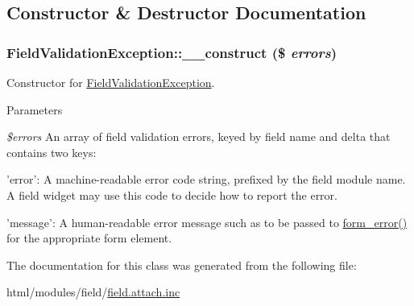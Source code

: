 \subsection{Constructor \& Destructor Documentation}
\hypertarget{classFieldValidationException_a9d96242a9e8d70ef4c9e614efed09a57}{
\subsubsection[{\_\-\_\-construct}]{\setlength{\rightskip}{0pt plus 5cm}FieldValidationException::\_\-\_\-construct (\$ {\em errors})}}
\label{classFieldValidationException_a9d96242a9e8d70ef4c9e614efed09a57}
Constructor for \hyperlink{classFieldValidationException}{FieldValidationException}.


\begin{DoxyParams}{Parameters}
\item[{\em \$errors}]An array of field validation errors, keyed by field name and delta that contains two keys:
\begin{DoxyItemize}
\item 'error': A machine-\/readable error code string, prefixed by the field module name. A field widget may use this code to decide how to report the error.
\item 'message': A human-\/readable error message such as to be passed to \hyperlink{group__form__api_ga0e6b470194005ad3ff2fbf45f671dfa9}{form\_\-error()} for the appropriate form element. 
\end{DoxyItemize}\end{DoxyParams}


The documentation for this class was generated from the following file:\begin{DoxyCompactItemize}
\item 
html/modules/field/\hyperlink{field_8attach_8inc}{field.attach.inc}\end{DoxyCompactItemize}
